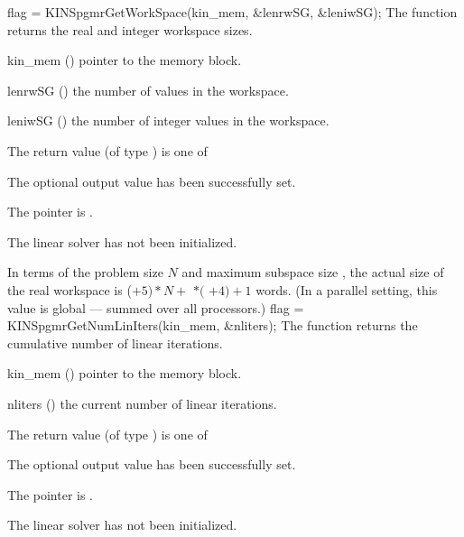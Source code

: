 {
  flag = KINSpgmrGetWorkSpace(kin\_mem, \&lenrwSG, \&leniwSG);
}
{
  The function  returns the
  {\kinspgmr} real and integer workspace sizes.
}
{
  \begin{args}
  \item[kin\_mem] ()
    pointer to the {\kinsol} memory block.
  \item[lenrwSG] ()
    the number of  values in the {\kinspgmr} workspace.
  \item[leniwSG] ()
    the number of integer values in the {\kinspgmr} workspace.
  \end{args}
}
{
  The return value  (of type ) is one of
  \begin{args}
  \item[\Id{KINSPGMR\_SUCCESS}] 
    The optional output value has been successfully set.
  \item[\Id{KINSPGMR\_MEM\_NULL}]
    The  pointer is .
  \item[\Id{KINSPGMR\_LMEM\_NULL}]
    The {\kinspgmr} linear solver has not been initialized.
  \end{args}
}
{
  In terms of the problem size $N$ and maximum subspace size , 
  the actual size of the real workspace is
  ($+ 5)*N +$  $*($ $ + 4) + 1$ 
  words.  (In a parallel setting, this value is global --- summed over
  all processors.)
}
{
  flag = KINSpgmrGetNumLinIters(kin\_mem, \&nliters);
}
{
  The function  returns the
  cumulative number of linear iterations.
}
{
  \begin{args}
  \item[kin\_mem] ()
    pointer to the {\kinsol} memory block.
  \item[nliters] ()
    the current number of linear iterations.
  \end{args}
}
{
  The return value  (of type ) is one of
  \begin{args}
  \item[\Id{KINSPGMR\_SUCCESS}] 
    The optional output value has been successfully set.
  \item[\Id{KINSPGMR\_MEM\_NULL}]
    The  pointer is .
  \item[\Id{KINSPGMR\_LMEM\_NULL}]
    The {\kinspgmr} linear solver has not been initialized.
  \end{args}
}
